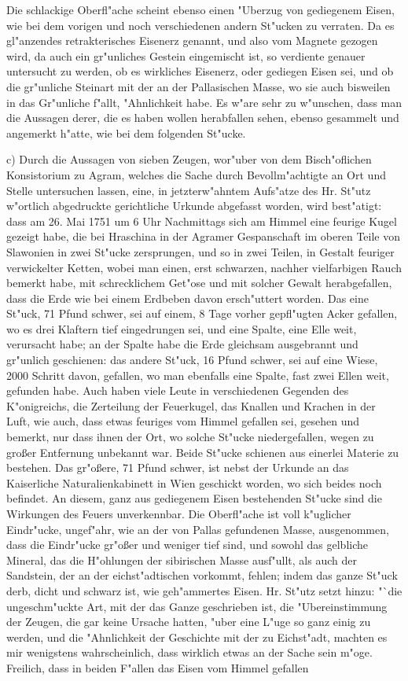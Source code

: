 \documentclass[a4paper, 11pt, oneside, polutonikogreek, german]{article}
\begin{document}
Die schlackige Oberfl"ache scheint ebenso einen "Uberzug von gediegenem Eisen, wie bei dem vorigen und noch verschiedenen andern St"ucken zu verraten. Da es gl"anzendes retrakterisches Eisenerz genannt, und also vom Magnete gezogen wird, da auch ein gr"unliches Gestein eingemischt ist, so verdiente genauer untersucht zu werden, ob es wirkliches Eisenerz, oder gediegen Eisen sei, und ob die gr"unliche Steinart mit der an der Pallasischen Masse, wo sie auch bisweilen in das Gr"unliche f"allt, "Ahnlichkeit habe. Es w"are sehr zu w"unschen, dass man die Aussagen derer, die es haben wollen herabfallen sehen, ebenso gesammelt und angemerkt h"atte, wie bei dem folgenden St"ucke.

c) Durch die Aussagen von sieben Zeugen, wor"uber von dem Bisch"oflichen Konsistorium zu Agram, welches die Sache durch Bevollm"achtigte an Ort und Stelle untersuchen lassen, eine, in jetzterw"ahntem Aufs"atze des Hr. St"utz w"ortlich abgedruckte gerichtliche Urkunde abgefasst worden, wird best"atigt: dass am 26. Mai 1751 um 6 Uhr Nachmittags sich am Himmel eine feurige Kugel gezeigt habe, die bei Hraschina in der Agramer Gespanschaft im oberen Teile von Slawonien in zwei St"ucke zersprungen, und so in zwei Teilen, in Gestalt feuriger verwickelter Ketten, wobei man einen, erst schwarzen, nachher vielfarbigen Rauch bemerkt habe, mit schrecklichem Get"ose und mit solcher Gewalt herabgefallen, dass die Erde wie bei einem Erdbeben davon ersch"uttert worden. Das eine St"uck, 71 Pfund schwer, sei auf einem, 8 Tage vorher gepfl"ugten Acker gefallen, wo es drei Klaftern tief eingedrungen sei, und eine Spalte, eine Elle weit, verursacht habe; an der Spalte habe die Erde gleichsam ausgebrannt und gr"unlich geschienen: das andere St"uck, 16 Pfund schwer, sei auf eine Wiese, 2000 Schritt davon, gefallen, wo man ebenfalls eine Spalte, fast zwei Ellen weit, gefunden habe. Auch haben viele Leute in verschiedenen Gegenden des K"onigreichs, die Zerteilung der Feuerkugel, das Knallen und Krachen in der Luft, wie auch, dass etwas feuriges vom Himmel gefallen sei, gesehen und bemerkt, nur dass ihnen der Ort, wo solche St"ucke niedergefallen, wegen zu großer Entfernung unbekannt war. Beide St"ucke schienen aus einerlei Materie zu bestehen. Das gr"oßere, 71 Pfund schwer, ist nebst der Urkunde an das Kaiserliche Naturalienkabinett in Wien geschickt worden, wo sich beides noch befindet. An diesem, ganz aus gediegenem Eisen bestehenden St"ucke sind die Wirkungen des Feuers unverkennbar. Die Oberfl"ache ist voll k"uglicher Eindr"ucke, ungef"ahr, wie an der von Pallas gefundenen Masse, ausgenommen, dass die Eindr"ucke gr"oßer und weniger tief sind, und sowohl das gelbliche Mineral, das die H"ohlungen der sibirischen Masse ausf"ullt, als auch der Sandstein, der an der eichst"adtischen vorkommt, fehlen; indem das ganze St"uck derb, dicht und schwarz ist, wie geh"ammertes Eisen. Hr. St"utz setzt hinzu: "`die ungeschm"uckte Art, mit der das Ganze geschrieben ist, die "Ubereinstimmung der Zeugen, die gar keine Ursache hatten, "uber eine L"uge so ganz einig zu werden, und die "Ahnlichkeit der Geschichte mit der zu Eichst"adt, machten es mir wenigstens wahrscheinlich, dass wirklich etwas an der Sache sein m"oge. Freilich, dass in beiden F"allen das Eisen vom Himmel gefallen 
\end{document}
